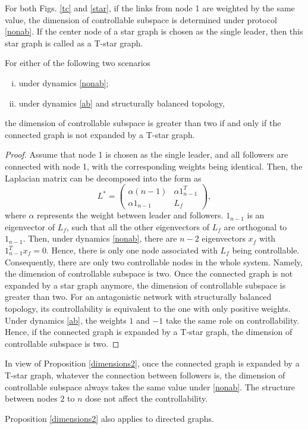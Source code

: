 \documentclass[a4paper,11pt]{article}
\begin{document}
For both Figs. \ref{tc} and \ref{star}, if the links from node 1 are weighted by the same value, the dimension of controllable subspace is determined under protocol \eqref{nonab}.  If the center node of a star graph is chosen as the single leader, then this star graph is called as a T-star graph.
{\begin{proposition}\label{dimensions2}
 For either of the following two scenarios
\begin{enumerate}[i)]
  \item under dynamics \eqref{nonab};
  \item under dynamics \eqref{ab} and structurally balanced topology,
\end{enumerate}
the dimension of controllable subspace is greater than two if and only if the connected graph is not expanded by a T-star graph.
\end{proposition}}
\begin{proof}
Assume that node 1 is chosen as the single leader, and all followers are connected with node 1, with the corresponding weights being identical. Then, the Laplacian matrix can be decomposed into the form as
\begin{equation*}
  L^*=\left(\begin{array}{*{20}{c}}
  \alpha(n-1)&\alpha 1_{n-1}^T\\
  \alpha 1_{n-1}&L_f
  \end{array}\right),
\end{equation*}
where $\alpha$ represents the weight between leader and followers. $1_{n-1}$ is an eigenvector of $L_f$, such that all the other eigenvectors of $L_f$ are orthogonal to $1_{n-1}$. Then, under dynamics \eqref{nonab}, there are $n-2$ eigenvectors $x_f$ with $1_{n-1}^Tx_f=0$. Hence, there is only one node associated with $L_f$ being controllable. Consequently, there are only two controllable nodes in the whole system. Namely, the dimension of controllable subspace is two.  Once the connected graph is not expanded by a star graph anymore, the dimension of controllable subspace is  greater than two. For an antagonistic network with structurally balanced topology, its controllability is equivalent to the one with only positive weights. Under dynamics \eqref{ab}, the weights $1$ and $-1$ take the same role on controllability. Hence, if the connected graph is expanded by a T-star graph, the dimension of controllable subspace is two.
\end{proof}

In view of Proposition \ref{dimensions2}, once the connected graph is expanded by a T-star graph, whatever the connection between followers is,
the dimension of controllable subspace always takes the same value under \eqref{nonab}. The structure between nodes $2$ to $n$ dose not affect the controllability.
\begin{remark}
 Proposition \ref{dimensions2} also applies to directed graphs.
\end{remark}
\end{document}
